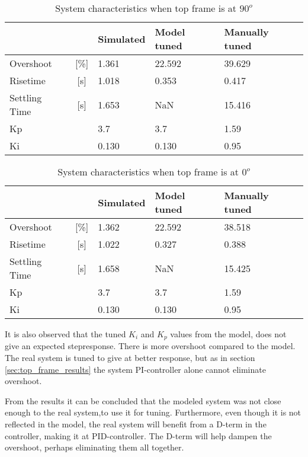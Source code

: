 \documentclass[../../Main]{subfiles}
\begin{document}
\begin{table}[H]
	\centering
	\begin{tabular}{lc|*{3}{l}}
		&&Simulated&Model tuned&Manually tuned\\
		\hline
		Overshoot&[\%]&1.361&22.592&39.629\\
		Risetime&[\si{s}]& 1.018&0.353&0.417\\
		Settling Time&[\si{s}]& 1.653&NaN& 15.416\\
		Kp&&3.7&3.7&1.59\\
		Ki&&0.130&0.130&0.95
	\end{tabular}
	\caption{System characteristics when top frame is at $90^o$}
	\label{tab:90_bot}
\end{table}

\begin{table}[H]
	\centering
	\begin{tabular}{lc|*{3}{l}}
		&&Simulated&Model tuned&Manually tuned\\
		\hline
		Overshoot&[\%]&1.362&22.592&38.518\\
		Risetime&[\si{s}]&1.022&0.327&0.388\\
		Settling Time&[\si{s}]&1.658&NaN&15.425\\
		Kp&&3.7&3.7&1.59\\
		Ki&&0.130&0.130&0.95
	\end{tabular}
	\caption{System characteristics when top frame is at $0^o$}
	\label{tab:0_bot}
\end{table}

It is also observed that the tuned $K_i$ and $K_p$ values from the model, does not give an expected stepresponse. There is more overshoot compared to the model. The real system is tuned to give at better response, but as in section \ref{sec:top_frame_results} the system PI-controller alone cannot eliminate overshoot.

From the results it can be concluded that the modeled system was not close enough to the real system,to use it for tuning. Furthermore, even though it is not reflected in the model, the real system will benefit from a D-term in the controller, making it at PID-controller. The D-term will help dampen the overshoot, perhaps eliminating them all together. 
\end{document}
